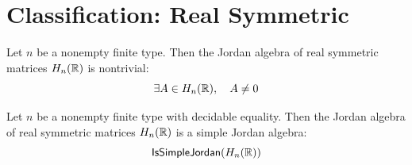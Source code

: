\section{Classification: Real Symmetric}

\begin{theorem}[nontrivial]
Let $n$ be a nonempty finite type. Then the Jordan algebra of real symmetric matrices $H_n(\mathbb{R})$ is nontrivial:
\[ \exists A \in H_n(\mathbb{R}), \quad A \ne 0 \]
\end{theorem}

\begin{proposition}[isSimple]
Let $n$ be a nonempty finite type with decidable equality. Then the Jordan algebra of real symmetric matrices $H_n(\mathbb{R})$ is a simple Jordan algebra:
\[ \mathsf{IsSimpleJordan}(H_n(\mathbb{R})) \]
\end{proposition}
